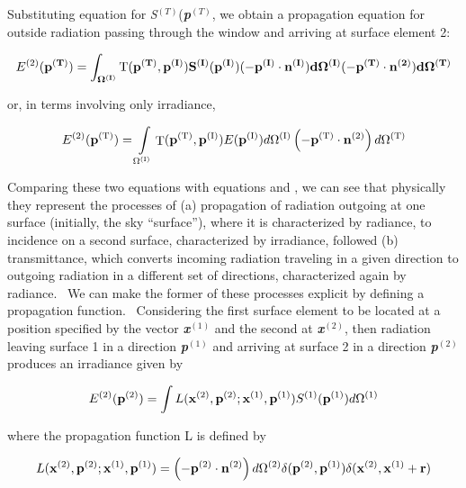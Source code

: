 Substituting equation for \emph{S}\(^{(T)}\)(\textbf{\emph{p}}\(^{(T)}\), we obtain a propagation equation for outside radiation passing through the window and arriving at surface element 2:

\begin{equation}
E^{(2)}(\bf{p}^{(T)}) = \int_{\Omega^{(I)}} 
      \rm T (\bf{p}^{(T)},\bf{p}^{(I)}) 
      S^{(I)}(\bf{p}^{(I)})(-\bf{p}^{(I)}\cdot\bf{n}^{(I)})
      d\Omega^{(I)}(-\bf{p}^{(T)}\cdot\bf{n}^{(2)})d\Omega^{(T)}
\end{equation}

or, in terms involving only irradiance,

\begin{equation}
{E^{{\rm{(2)}}}}({{\bf{p}}^{{\rm{(T)}}}}) = \int\limits_{{\Omega ^{{\rm{(I)}}}}} {{\mathop{\rm T}\nolimits} ({{\bf{p}}^{{\rm{(T)}}}},{{\bf{p}}^{{\rm{(I)}}}})E({{\bf{p}}^{{\rm{(I)}}}})d{\Omega ^{{\rm{(I)}}}}} \left( { - {{\bf{p}}^{{\rm{(T)}}}} \cdot {{\bf{n}}^{{\rm{(2)}}}}} \right)d{\Omega ^{{\rm{(T)}}}}
\end{equation}

Comparing these two equations with equations and , we can see that physically they represent the processes of (a) propagation of radiation outgoing at one surface (initially, the sky ``surface''), where it is characterized by radiance, to incidence on a second surface, characterized by irradiance, followed (b) transmittance, which converts incoming radiation traveling in a given direction to outgoing radiation in a different set of directions, characterized again by radiance.~ We can make the former of these processes explicit by defining a propagation function.~ Considering the first surface element to be located at a position specified by the vector \textbf{\emph{x}}\(^{(1)}\) and the second at \textbf{\emph{x}}\(^{(2)}\), then radiation leaving surface 1 in a direction \textbf{\emph{p}}\(^{(1)}\) and arriving at surface 2 in a direction \textbf{\emph{p}}\(^{(2)}\) produces an irradiance given by

\begin{equation}
{E^{(2)}}({{\bf{p}}^{{\rm{(2)}}}}) = \int {L({{\bf{x}}^{{\rm{(2)}}}},{{\bf{p}}^{{\rm{(2)}}}};{{\bf{x}}^{{\rm{(1)}}}},{{\bf{p}}^{{\rm{(1)}}}}){S^{{\rm{(1)}}}}({{\bf{p}}^{{\rm{(1)}}}})} d{\Omega ^{{\rm{(1)}}}}
\end{equation}

where the propagation function L is defined by

\begin{equation}
L({{\bf{x}}^{{\rm{(2)}}}},{{\bf{p}}^{{\rm{(2)}}}};{{\bf{x}}^{{\rm{(1)}}}},{{\bf{p}}^{{\rm{(1)}}}}) = \left( { - {{\bf{p}}^{{\rm{(2)}}}}\cdot {{\bf{n}}^{{\rm{(2)}}}}} \right)d{\Omega ^{{\rm{(2)}}}}\delta ({{\bf{p}}^{{\rm{(2)}}}},{{\bf{p}}^{{\rm{(1)}}}})\delta ({{\bf{x}}^{{\rm{(2)}}}},{{\bf{x}}^{{\rm{(1)}}}} + {\bf{r}})
\end{equation}

